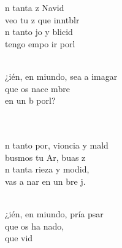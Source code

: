 \documentclass[12pt]{article}
\begin{document}
\begin{multicols*}{2}
\begin{cancion}%
	n tanta z  Navid\\
	 veo tu z que inntblr \\
	n tanto jo y blicid\\
	 tengo empo  ir  porl \\\jump\\
	\begin{chorus}%
	¿ién, en miundo, sea a imagar \\
	que os nace mbre\\
	en un b porl?  \\
	\end{chorus}%
	\jump\\
	  \\
\jump
	n tanto por, vioncia y mald\\
	busmos tu Ar, buas  z \\
	n tanta rieza y modid,\\
	 vas a nar en un bre j. \\\jump\\
	\begin{chorus}%
	¿ién, en miundo, pría psar \\
	que os ha nado,\\
	que  vid \\
	\end{chorus}%
	\jump\\

\end{cancion}
\end{multicols*}
\end{document}
